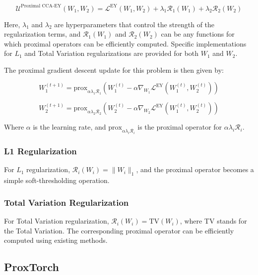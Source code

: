 \begin{equation}
    \label{eq:proximal-CCA-EY}
    \mathcal{U}^{\text{Proximal CCA-EY}}(W_1, W_2) = \mathcal{L}^{\text{EY}}(W_1, W_2) + \lambda_1 \mathcal{R}_1(W_1) + \lambda_2 \mathcal{R}_2(W_2)
\end{equation}

Here, \( \lambda_1 \) and \( \lambda_2 \) are hyperparameters that control the strength of the regularization terms, and \( \mathcal{R}_1(W_1) \) and \( \mathcal{R}_2(W_2) \) can be any functions for which proximal operators can be efficiently computed.
Specific implementations for \( L_1 \) and Total Variation regularizations are provided for both \( W_1 \) and \( W_2 \).

The proximal gradient descent update for this problem is then given by:

\begin{equation}
    \label{eq:proximal-update}
    W_1^{(t+1)} = \text{prox}_{\alpha \lambda_1 \mathcal{R}_1}\left( W_1^{(t)} - \alpha \nabla_{W_1} \mathcal{L}^{\text{EY}}(W_1^{(t)}, W_2^{(t)}) \right)
\end{equation}

\begin{equation}
    \label{eq:proximal-update-W2}
    W_2^{(t+1)} = \text{prox}_{\alpha \lambda_2 \mathcal{R}_2}\left( W_2^{(t)} - \alpha \nabla_{W_2} \mathcal{L}^{\text{EY}}(W_1^{(t)}, W_2^{(t)}) \right)
\end{equation}

Where \( \alpha \) is the learning rate, and \( \text{prox}_{\alpha \lambda_i \mathcal{R}_i} \) is the proximal operator for \( \alpha \lambda_i \mathcal{R}_i \).

\subsubsection{L1 Regularization}
For \( L_1 \) regularization, \( \mathcal{R}_i(W_i) = \| W_i \|_1 \), and the proximal operator becomes a simple soft-thresholding operation.

\subsubsection{Total Variation Regularization}
For Total Variation regularization, \( \mathcal{R}_i(W_i) = \text{TV}(W_i) \), where TV stands for the Total Variation.
The corresponding proximal operator can be efficiently computed using existing methods.

\subsection{ProxTorch}

